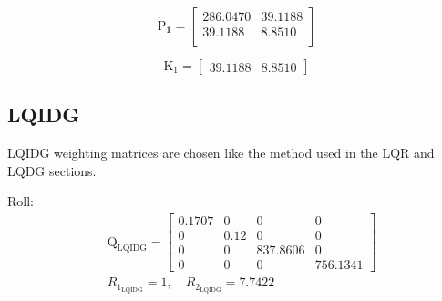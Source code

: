 \documentclass[conference]{IEEEtran}
\begin{document}
\begin{equation}
	\boldsymbol{\dot{\mathrm{P}}_{1}} = \begin{bmatrix}
		
		286.0470  & 39.1188\\
		39.1188   & 8.8510\\
    \end{bmatrix}    
\end{equation}

\begin{equation}
    \boldsymbol{\mathrm{K_{1}}} = \begin{bmatrix}
        39.1188   & 8.8510
    \end{bmatrix}
\end{equation}

\subsection{LQIDG}
LQIDG weighting matrices are chosen like the method used in the LQR and LQDG sections.

Roll:
\begin{equation}
    \begin{split}
        &\boldsymbol{\mathrm{Q_{{\text{LQIDG}}}}} = \begin{bmatrix}
            0.1707 &0& 0& 0\\
            0 &  0.12 & 0 &0 \\
            0 & 0 & 837.8606 & 0\\
            0 & 0 & 0 & 756.1341
        \end{bmatrix}
        \\[1em]
        &R_{1_{\text{LQIDG}}} =  1, \quad R_{2_{\text{LQIDG}}} =  7.7422
    \end{split}
\end{equation}
\end{document}
